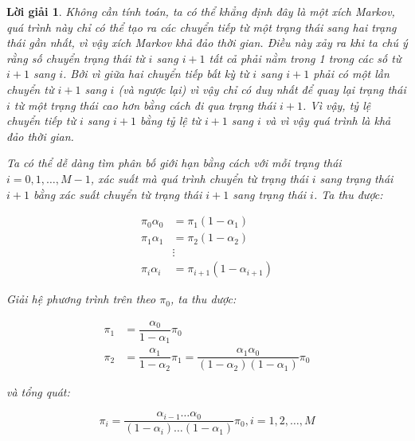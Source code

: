 \documentclass[14pt, a4paper]{article}
\numberwithin{equation}{section}
\numberwithin{figure}{section}
\theoremstyle{sltheorem}
\theoremstyle{soltheorem}
\newtheorem*{loigiai}{Lời giải}
\numberwithin{dl}{section}
\numberwithin{md}{section}
\numberwithin{vd}{section}
\begin{document}
    \begin{loigiai}
        Không cần tính toán, ta có thể khẳng định đây là một xích Markov, quá trình này chỉ có thể tạo ra các chuyển tiếp từ một trạng thái sang hai trạng thái gần nhất, vì vậy xích Markov khả đảo thời gian.
        Điều này xảy ra khi ta chú ý rằng số chuyển trạng thái từ $i$ sang $i+1$ tất cả phải nằm trong 1 trong các số từ $i+1$ sang $i$.
        Bởi vì giữa hai chuyển tiếp bất kỳ từ $i$ sang $i+1$ phải có một lần chuyển từ $i+1$ sang $i$ (và ngược lại) vì vậy chỉ có duy nhất để quay lại trạng thái $i$ từ một trạng thái cao hơn bằng cách đi qua trạng thái $i+1$.
        Vì vậy, tỷ lệ chuyển tiếp từ $i$ sang $i+1$ bằng tỷ lệ từ $i+1$ sang $i$ và vì vậy quá trình là khả đảo thời gian.

        Ta có thể dễ dàng tìm phân bố giới hạn bằng cách với mỗi trạng thái $i=0,1,\dots,M-1$, xác suất mà quá trình chuyển từ trạng thái $i$ sang trạng thái $i+1$ bằng xác suất chuyển từ trạng thái $i+1$ sang trạng thái $i$.
        Ta thu được:
        
        \begin{equation*}
            \begin{aligned}
                \pi_0 \alpha_0 &= \pi_1 (1 - \alpha_1) \\
                \pi_1 \alpha_1 &= \pi_2 (1 - \alpha_2) \\
                & \vdots \\
                \pi_i \alpha_i &= \pi_{i+1} (1 - \alpha_{i+1})
            \end{aligned}
        \end{equation*}

        Giải hệ phương trình trên theo $\pi_0$, ta thu dược:

        \begin{equation*}
            \begin{aligned}
                \pi_1 &= \dfrac{\alpha_0}{1-\alpha_1} \pi_0 \\
                \pi_2 &= \dfrac{\alpha_1}{1-\alpha_2} \pi_1 = \dfrac{\alpha_1 \alpha_0}{(1-\alpha_2)(1-\alpha_1)} \pi_0
            \end{aligned}
        \end{equation*}

        và tổng quát:

        \begin{equation*}
            \pi_i = \dfrac{\alpha_{i-1}\dots \alpha_0}{(1-\alpha_i)\dots(1-\alpha_1)} \pi_0, i = 1, 2, \dots, M
        \end{equation*}


\end{loigiai}
\end{document}
